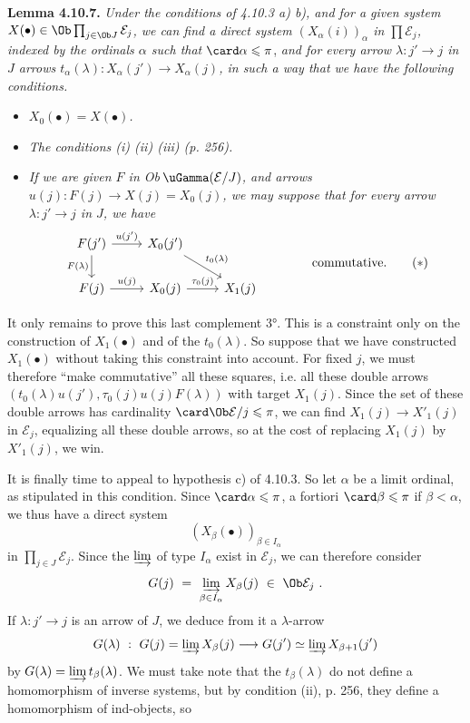 \textbf{Lemma 4.10.7.} \textit{Under the conditions of 4.10.3 a) b), and for a given system $X(\bullet)\in\Ob\prod_{j\in\Ob J}\mathcal{E}_j$, we can find a direct system $(X_\alpha(i))_\alpha$ in $\prod\mathcal{E}_j$, indexed by the ordinals $\alpha$ such that} $\card\alpha\leqslant\pi$, \textit{and for every arrow $\lambda : j'\longrightarrow j$ in $J$ arrows $t_\alpha(\lambda) : X_\alpha(j')\longrightarrow X_\alpha(j)$, in such a way that we have the following conditions.} %
\begin{itemize}[leftmargin=3em]
\item[\textit{1°)}] \textit{$X_0(\bullet)=X(\bullet)$.}
\item[\textit{2°)}] \textit{The conditions (i) (ii) (iii) (p. 256).}
\item[\textit{3°)}] \textit{If we are given $F$ in \textup{Ob}$\,\uGamma(\mathcal{E}/J)$, and arrows $u(j) : F(j)\longrightarrow X(j)=X_0(j)$, we may suppose that for every arrow $\lambda : j'\longrightarrow j$ in $J$, we have}
\[
\begin{tikzcd}
F(j') \arrow[r,"u(j')"] \arrow[d,"F(\lambda)"'] & X_0(j') \arrow[dr,"t_0(\lambda)"] & \\
F(j) \arrow[r,"u(j)"] & X_0(j) \arrow[r,"\tau_0(j)"] & X_1(j)
\end{tikzcd}
\qquad\qquad \text{commutative.}
\tag*{$(*)$}
\]
\end{itemize}

It only remains to prove this last complement 3°. This is a constraint only on the construction of $X_1(\bullet)$ and of the $t_0(\lambda)$. So suppose that we have constructed $X_1(\bullet)$ without taking this constraint into account. For fixed $j$, we must therefore ``make commutative'' all these squares, i.e. all these double arrows $(t_0(\lambda)u(j'),\tau_0(j)u(j)F(\lambda))$ with target $X_1(j)$. Since the set of these double arrows has cardinality $\card\Ob\mathcal{E}/j\leqslant\pi$, we can find $X_1(j)\longrightarrow X'_1(j)$ in $\mathcal{E}_j$, equalizing all these double arrows, so at the cost of replacing $X_1(j)$ by $X'_1(j)$, we win.

It is finally time to appeal to hypothesis c) of 4.10.3. So let $\alpha$ be a limit ordinal, as stipulated in this condition. Since $\card\alpha\leqslant\pi$, a fortiori $\card\beta\leqslant\pi$ if $\beta<\alpha$, we thus have a direct system
\[
(X_\beta(\bullet))_{\beta\in I_\alpha}
\]
in $\prod_{j\in J}\mathcal{E}_j$. Since the $\varinjlim$ of type $I_\alpha$ exist in $\mathcal{E}_j$, we can therefore consider
\[
G(j)\ =\ \varinjlim_{\beta\in I_\alpha} X_\beta(j)\ \in\ \Ob\mathcal{E}_j\ .
\]
If $\lambda : j'\longrightarrow j$ is an arrow of $J$, we deduce from it a $\lambda$-arrow
\[
G(\lambda)\ :\ G(j)=\varinjlim X_\beta(j) \longrightarrow G(j')\simeq\varinjlim X_{\beta+1}(j')
\]
by $G(\lambda)=\varinjlim t_\beta(\lambda)$. We must
take note that the $t_\beta(\lambda)$ do not define a homomorphism of inverse systems, but by condition (ii), p. 256, they define a homomorphism of ind-objects, so
